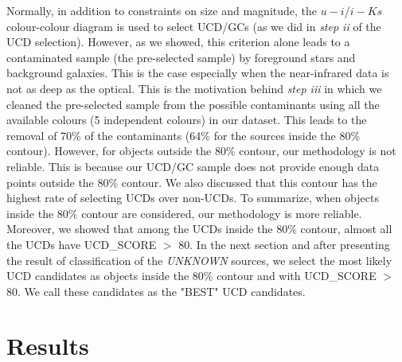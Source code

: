 \documentclass[fleqn,usenatbib]{mnras}
\begin{document}
Normally, in addition to constraints on size and magnitude, the $u-i$/$i-Ks$ colour-colour diagram is used to select UCD/GCs (as we did in \textit{step ii} of the UCD selection). However, as we showed, this criterion alone leads to a contaminated sample (the pre-selected sample) by foreground stars and background galaxies. This is the case especially when the near-infrared data is not as deep as the optical. This is the motivation behind \textit{step iii} in which we cleaned the pre-selected sample from the possible contaminants using all the available colours (5 independent colours) in our dataset. This leads to the removal of 70\% of the contaminants (64\% for the sources inside the 80\% contour). However, for objects outside the 80\% contour, our methodology is not reliable. This is because our UCD/GC sample does not provide enough data points outside the 80\% contour. We also discussed that this contour has the highest rate of selecting UCDs over non-UCDs. To summarize, when objects inside the 80\% contour are considered, our methodology is more reliable. Moreover, we showed that among the UCDs inside the 80\% contour, almost all the UCDs have UCD\_SCORE $>$ 80. In the next section and after presenting the result of classification of the \textit{UNKNOWN} sources, we select the most likely UCD candidates as objects inside the 80\% contour and with UCD\_SCORE $>$ 80. We call these candidates as the "BEST" UCD candidates. 

\section{Results}
\label{sec5}
\end{document}
